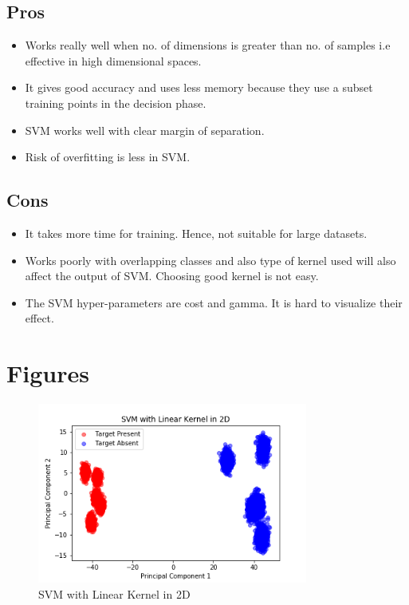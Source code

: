 \documentclass[journal,12pt,twocolumn]{IEEEtran}
\begin{document}
\subsection{Pros}
\begin{itemize}
\item Works really well when no. of dimensions is greater than no. of samples i.e effective in high dimensional spaces.
\item It gives good accuracy and uses less memory because they use a subset training points in the decision phase.
\item SVM works well with clear margin of separation.
\item Risk of overfitting is less in SVM.
\end{itemize}


\subsection{Cons}
\begin{itemize}
\item It takes more time for training. Hence, not suitable for large datasets.
\item Works poorly with overlapping classes and also type of kernel used will also affect the output of SVM. Choosing good kernel is not easy.
\item The SVM hyper-parameters are cost and gamma. It is hard to visualize their effect.
\end{itemize}

\section{Figures}
\begin{figure}[!h]
\begin{center}
\includegraphics[width=3.5in]{figs/LinSVM_2D.png}
\end{center}
\caption{SVM with Linear Kernel in 2D}
\label{fig: 2D Plot}
\end{figure}
\end{document}
